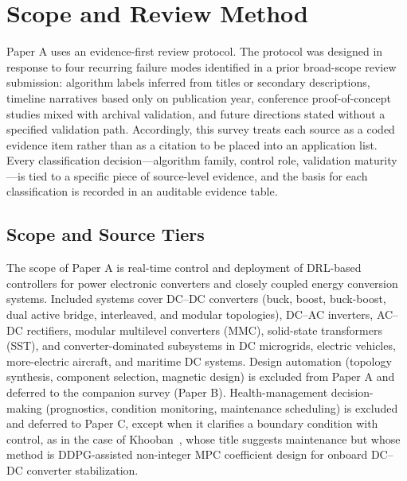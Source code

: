 \documentclass[manuscript,screen,review]{acmart}
\begin{document}
\section{Scope and Review Method}
\label{sec:review-method}

Paper A uses an evidence-first review protocol.
The protocol was designed in response to four recurring failure modes identified in a prior broad-scope review submission: algorithm labels inferred from titles or secondary descriptions, timeline narratives based only on publication year, conference proof-of-concept studies mixed with archival validation, and future directions stated without a specified validation path.
Accordingly, this survey treats each source as a coded evidence item rather than as a citation to be placed into an application list.
Every classification decision---algorithm family, control role, validation maturity---is tied to a specific piece of source-level evidence, and the basis for each classification is recorded in an auditable evidence table.

\subsection{Scope and Source Tiers}

The scope of Paper A is real-time control and deployment of DRL-based controllers for power electronic converters and closely coupled energy conversion systems.
Included systems cover DC--DC converters (buck, boost, buck-boost, dual active bridge, interleaved, and modular topologies), DC--AC inverters, AC--DC rectifiers, modular multilevel converters (MMC), solid-state transformers (SST), and converter-dominated subsystems in DC microgrids, electric vehicles, more-electric aircraft, and maritime DC systems.
Design automation (topology synthesis, component selection, magnetic design) is excluded from Paper A and deferred to the companion survey (Paper B).
Health-management decision-making (prognostics, condition monitoring, maintenance scheduling) is excluded and deferred to Paper C, except when it clarifies a boundary condition with control, as in the case of Khooban~\cite{khooban2022smartenance}, whose title suggests maintenance but whose method is DDPG-assisted non-integer MPC coefficient design for onboard DC--DC converter stabilization.
\end{document}
